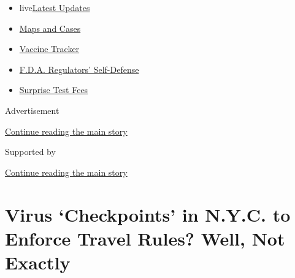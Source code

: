 \begin{itemize}
\tightlist
\item
  live\href{https://www.nytimes3xbfgragh.onion/2020/09/11/world/covid-19-coronavirus.html?name=styln-coronavirus-national\&region=TOP_BANNER\&block=storyline_menu_recirc\&action=click\&pgtype=Article\&impression_id=afaf62b1-f4bb-11ea-bfcd-b5364c666c0c\&variant=undefined}{Latest
  Updates}
\item
  \href{https://www.nytimes3xbfgragh.onion/interactive/2020/us/coronavirus-us-cases.html?name=styln-coronavirus-national\&region=TOP_BANNER\&block=storyline_menu_recirc\&action=click\&pgtype=Article\&impression_id=afaf62b2-f4bb-11ea-bfcd-b5364c666c0c\&variant=undefined}{Maps
  and Cases}
\item
  \href{https://www.nytimes3xbfgragh.onion/interactive/2020/science/coronavirus-vaccine-tracker.html?name=styln-coronavirus-national\&region=TOP_BANNER\&block=storyline_menu_recirc\&action=click\&pgtype=Article\&impression_id=afaf62b3-f4bb-11ea-bfcd-b5364c666c0c\&variant=undefined}{Vaccine
  Tracker}
\item
  \href{https://www.nytimes3xbfgragh.onion/2020/09/10/us/politics/fda-coronavirus-vaccine.html?name=styln-coronavirus-national\&region=TOP_BANNER\&block=storyline_menu_recirc\&action=click\&pgtype=Article\&impression_id=afaf62b4-f4bb-11ea-bfcd-b5364c666c0c\&variant=undefined}{F.D.A.
  Regulators' Self-Defense}
\item
  \href{https://www.nytimes3xbfgragh.onion/2020/09/09/upshot/coronavirus-surprise-test-fees.html?name=styln-coronavirus-national\&region=TOP_BANNER\&block=storyline_menu_recirc\&action=click\&pgtype=Article\&impression_id=afaf62b5-f4bb-11ea-bfcd-b5364c666c0c\&variant=undefined}{Surprise
  Test Fees}
\end{itemize}

Advertisement

\protect\hyperlink{after-top}{Continue reading the main story}

Supported by

\protect\hyperlink{after-sponsor}{Continue reading the main story}

\hypertarget{virus-checkpoints-in-nyc-to-enforce-travel-rules-well-not-exactly}{%
\section{Virus `Checkpoints' in N.Y.C. to Enforce Travel Rules? Well,
Not
Exactly}\label{virus-checkpoints-in-nyc-to-enforce-travel-rules-well-not-exactly}}

